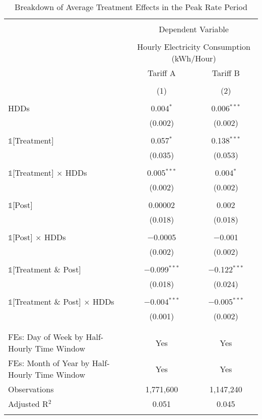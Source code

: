 
\begin{table}[!htbp] \centering 
  \caption{Breakdown of Average Treatment Effects in the Peak Rate Period} 
  \label{Table:Breakdown-of-Average-Treatment-Effects-in-the-Peak-Rate-Period_For-Each-Tariff} 
\small 
\begin{tabular}{@{\extracolsep{20pt}}lcc} 
\\[-1.8ex]\hline 
\hline \\[-1.8ex] 
 & \multicolumn{2}{c}{Dependent Variable} \\ 
\cline{2-3} 
\\[-1.8ex] & \multicolumn{2}{c}{Hourly Electricity Consumption  (kWh/Hour)} \\ 
 & Tariff A & Tariff B \\ 
\\[-1.8ex] & (1) & (2)\\ 
\hline \\[-1.8ex] 
 HDDs & 0.004$^{*}$ & 0.006$^{***}$ \\ 
  & (0.002) & (0.002) \\ 
  & & \\ 
 $\mathbb{1}$[Treatment] & 0.057$^{*}$ & 0.138$^{***}$ \\ 
  & (0.035) & (0.053) \\ 
  & & \\ 
 $\mathbb{1}$[Treatment] $\times$ HDDs & 0.005$^{***}$ & 0.004$^{*}$ \\ 
  & (0.002) & (0.002) \\ 
  & & \\ 
 $\mathbb{1}$[Post] & 0.00002 & 0.002 \\ 
  & (0.018) & (0.018) \\ 
  & & \\ 
 $\mathbb{1}$[Post] $\times$ HDDs & $-$0.0005 & $-$0.001 \\ 
  & (0.002) & (0.002) \\ 
  & & \\ 
 $\mathbb{1}$[Treatment \& Post] & $-$0.099$^{***}$ & $-$0.122$^{***}$ \\ 
  & (0.018) & (0.024) \\ 
  & & \\ 
 $\mathbb{1}$[Treatment \& Post] $\times$ HDDs & $-$0.004$^{***}$ & $-$0.005$^{***}$ \\ 
  & (0.001) & (0.002) \\ 
  & & \\ 
\hline \\[-1.8ex] 
FEs: Day of Week by Half-Hourly Time Window & Yes & Yes \\ 
FEs: Month of Year by Half-Hourly Time Window & Yes & Yes \\ 
Observations & 1,771,600 & 1,147,240 \\ 
Adjusted R$^{2}$ & 0.051 & 0.045 \\ 
\hline 
\hline \\[-1.8ex] 
\end{tabular} 
\end{table} 
